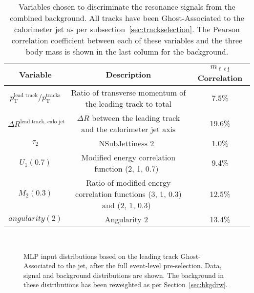\documentclass[NOTE, atlasdraft=true, texlive=2017, UKenglish]{\ATLASLATEXPATH atlasdoc}
\begin{document}
\begin{table}[!htbp]{\footnotesize\renewcommand{\arraystretch}{1.2}
    \begin{center}
      \begin{tabular}{|c|c|c|}
        \hline
        Variable & Description & $m_{\ell\ell\text{j}}$ Correlation \\
        \hline
        $p_\text{T}^{\text{lead\ track}}/p_\text{T}^{\text{tracks}}$ & Ratio of transverse momentum of the leading track to total & 7.5\% \\
        $\Delta R^\text{lead\ track,\ calo\ jet}$ & $\Delta R$ between the leading track and the calorimeter jet axis & 19.6\% \\
        $\tau_{\text{2}}$ & NSubJettiness 2~\cite{Thaler:2010tr} & 1.0\% \\
        $U_1(0.7)$ & Modified energy correlation function (2, 1, 0.7)~\cite{Moult:2016cvt} & 9.4\% \\
        $M_2(0.3)$ & Ratio of modified energy correlation functions (3, 1, 0.3) and (2, 1, 0.3)~\cite{Moult:2016cvt} & 12.5\% \\
        $angularity(2)$ & Angularity 2~\cite{Almeida:2008yp} & 13.4\% \\
        \hline
      \end{tabular}
      \caption{Variables chosen to discriminate the resonance signals from the combined background. All tracks have been Ghost-Associated to the calorimeter jet as per subsection~\ref{sec:trackselection}. The Pearson correlation coefficient between each of these variables and the three body mass is shown in the last column for the background.}
      \label{tab:mlpvars}
  \end{center}}
\end{table}

\begin{figure}[!htbp]
  \centering
  \\
  \caption{MLP input distributions based on the leading track Ghost-Associated to the jet, after the full event-level pre-selection. Data, signal and background distributions are shown. The background in these distributions has been reweighted as per Section~\ref{sec:bkgdrw}.}
  \label{fig:leadtrackvars}
\end{figure}
\end{document}
